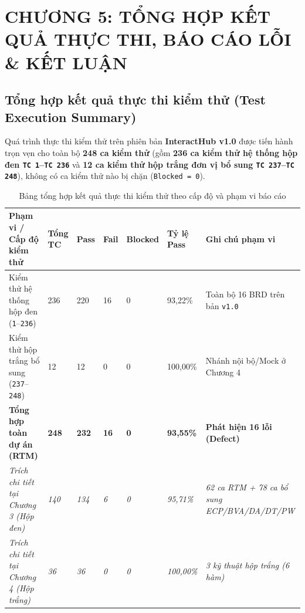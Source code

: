 \documentclass[11pt,a4paper]{article}
\begin{document}
\pagebreak
\section{CHƯƠNG 5: TỔNG HỢP KẾT QUẢ THỰC THI, BÁO CÁO LỖI \& KẾT LUẬN}

\subsection{Tổng hợp kết quả thực thi kiểm thử (Test Execution Summary)}
Quá trình thực thi kiểm thử trên phiên bản \textbf{InteractHub v1.0} được tiến hành trọn vẹn cho toàn bộ \textbf{248 ca kiểm thử} (gồm \textbf{236 ca kiểm thử hệ thống hộp đen \texttt{TC 1}--\texttt{TC 236}} và \textbf{12 ca kiểm thử hộp trắng đơn vị bổ sung \texttt{TC 237}--\texttt{TC 248}}), không có ca kiểm thử nào bị chặn (\texttt{Blocked = 0}).

\begin{table}[H]
\centering
\small
\setlength{\tabcolsep}{4pt}
\begin{tabularx}{\textwidth}{|L{4.0cm}|C{1.2cm}|C{1.05cm}|C{0.95cm}|C{1.35cm}|C{1.65cm}|X|}
\hline
{}
\textbf{Phạm vi / Cấp độ kiểm thử} & \textbf{Tổng TC} & \textbf{Pass} & \textbf{Fail} & \textbf{Blocked} & \textbf{Tỷ lệ Pass} & \textbf{Ghi chú phạm vi} \tabularnewline
\hline
Kiểm thử hệ thống hộp đen (\texttt{1}--\texttt{236}) & 236 & 220 & 16 & 0 & 93,22\% & Toàn bộ 16 BRD trên bản \texttt{v1.0} \\ \hline
Kiểm thử hộp trắng bổ sung (\texttt{237}--\texttt{248}) & 12 & 12 & 0 & 0 & 100,00\% & Nhánh nội bộ/Mock ở Chương 4 \\ \hline
{}
\textbf{Tổng hợp toàn dự án (RTM)} & \textbf{248} & \textbf{232} & \textbf{16} & \textbf{0} & \textbf{93,55\%} & \textbf{Phát hiện 16 lỗi (Defect)} \\ \hline
\textit{Trích chi tiết tại Chương 3 (Hộp đen)} & \textit{140} & \textit{134} & \textit{6} & \textit{0} & \textit{95,71\%} & \textit{62 ca RTM + 78 ca bổ sung ECP/BVA/DA/DT/PW} \\ \hline
\textit{Trích chi tiết tại Chương 4 (Hộp trắng)} & \textit{36} & \textit{36} & \textit{0} & \textit{0} & \textit{100,00\%} & \textit{3 kỹ thuật hộp trắng (6 hàm)} \\ \hline
\end{tabularx}
\caption{Bảng tổng hợp kết quả thực thi kiểm thử theo cấp độ và phạm vi báo cáo}
\end{table}
\end{document}
